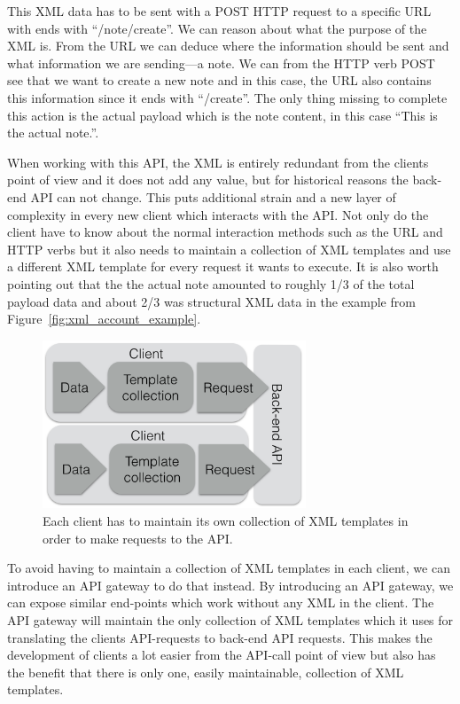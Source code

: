 \documentclass{cslthse-msc}
\begin{document}
This XML data has to be sent with a POST HTTP request to a specific URL with ends with \enquote{/note/create}. We can reason about what the purpose of the XML is. From the URL we can deduce where the information should be sent and what information we are sending---a note. We can from the HTTP verb POST see that we want to create a new note and in this case, the URL also contains this information since it ends with \enquote{/create}. The only thing missing to complete this action is the actual payload which is the note content, in this case \enquote{This is the actual note.}.

When working with this API, the XML is entirely redundant from the clients point of view and it does not add any value, but for historical reasons the back-end API can not change. This puts additional strain and a new layer of complexity in every new client which interacts with the API. Not only do the client have to know about the normal interaction methods such as the URL and HTTP verbs but it also needs to maintain a collection of XML templates and use a different XML template for every request it wants to execute. It is also worth pointing out that the the actual note amounted to roughly 1/3 of the total payload data and about 2/3 was structural XML data in the example from Figure~\ref{fig:xml_account_example}.

\begin{figure}[H]
  \centering
    \begin{center}
      \includegraphics[width=0.7\textwidth]{images/client_templates.png}
    \end{center}
  \caption{Each client has to maintain its own collection of XML templates in order to make requests to the API.}
\end{figure}

To avoid having to maintain a collection of XML templates in each client, we can introduce an API gateway to do that instead. By introducing an API gateway, we can expose similar end-points which work without any XML in the client. The API gateway will maintain the only collection of XML templates which it uses for translating the clients API-requests to back-end API requests. This makes the development of clients a lot easier from the API-call point of view but also has the benefit that there is only one, easily maintainable, collection of XML templates.
\end{document}
